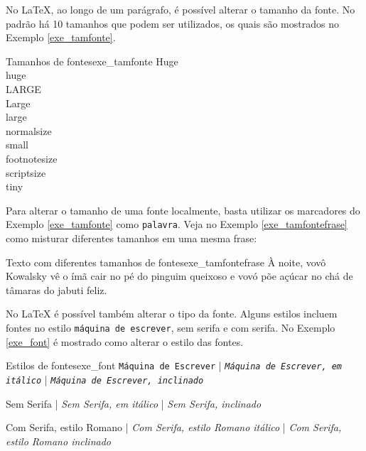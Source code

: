 No \LaTeX{}, ao longo de um parágrafo, é possível alterar o tamanho da fonte. No padrão há 10 tamanhos que podem ser utilizados, os quais são mostrados no Exemplo \ref{exe_tamfonte}.

\begin{texexptitled}[breakable,center lower,enhanced,middle=2mm,listing side text]{Tamanhos de fontes}{exe_tamfonte}
{\Huge Huge}                 \\
{\huge huge}                 \\
{\LARGE LARGE}               \\
{\Large Large}               \\
{\large large}               \\
{\normalsize normalsize}     \\
{\small small}               \\
{\footnotesize footnotesize} \\
{\scriptsize scriptsize}     \\
{\tiny tiny}
\end{texexptitled}

Para alterar o tamanho de uma fonte localmente, basta utilizar os marcadores do Exemplo \ref{exe_tamfonte} como \texttt{{\large palavra}}. Veja no Exemplo \ref{exe_tamfontefrase} como misturar diferentes tamanhos em uma mesma frase:

\begin{texexptitled}[breakable,center lower,enhanced,middle=2mm]{Texto com diferentes tamanhos de fontes}{exe_tamfontefrase}
À noite, vovô {\large Kowalsky} vê o {\huge ímã} cair no {\small pé} do pinguim {\Huge queixoso} e vovó põe açúcar no {\footnotesize chá} de {\tiny tâmaras} do jabuti feliz. 
\end{texexptitled}

No \LaTeX{} é possível também alterar o tipo da fonte. Alguns estilos incluem fontes no estilo \texttt{máquina de escrever}, \textsf{sem serifa} e \textrm{com serifa}. No Exemplo \ref{exe_font} é mostrado como alterar o estilo das fontes.

\begin{texexptitled}[breakable,center lower,enhanced,middle=2mm]{Estilos de fontes}{exe_font}
\texttt{Máquina de Escrever} | \texttt{\textit{Máquina de Escrever, em itálico}} | \texttt{\textsl{Máquina de Escrever, inclinado}}

\textsf{Sem Serifa} | \textsf{\textit{Sem Serifa, em itálico}} | \textsf{\textsl{Sem Serifa, inclinado}}

\textrm{Com Serifa, estilo Romano} | \textrm{\textit{Com Serifa, estilo Romano itálico}} | \textrm{\textsl{Com Serifa, estilo Romano inclinado}}
\end{texexptitled}

